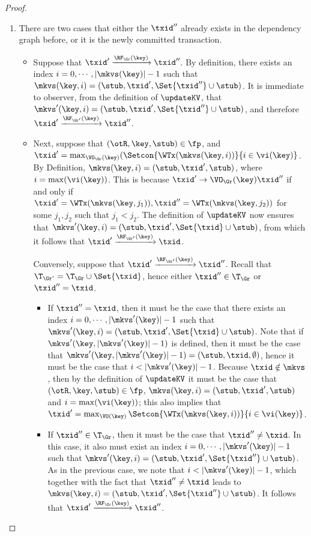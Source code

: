 \begin{proof}
\begin{enumerate}
\item There are two cases that either the \( \txid'' \) already exists in the dependency graph before,
or it is the newly committed transaction.
\begin{itemize}
\item Suppose that $\txid' \xrightarrow{\RF_{\Gr}(\key)} \txid''$. 
By definition, there exists an index $i = 0,\cdots, \lvert \mkvs(\key) \rvert - 1$ 
such that $\mkvs(\key, i) = (\stub, \txid', \Set{\txid''} \cup \stub)$. It is immediate 
to observer, from the definition of $\updateKV$, that $\mkvs'(\key, i) = (\stub, \txid', \Set{\txid''} \cup \stub)$, 
and therefore $\txid' \xrightarrow{\RF_{\Gr'}(\key)} \txid''$. 

\item Next, suppose that $(\otR, \key, \stub) \in \fp$, and $\txid' = \max_{\VO_{\Gr}(\key)}(\Setcon{\WTx(\mkvs(\key, i)) }{ i \in \vi(\key)}$. 
By Definition, $\mkvs(\key, i) = (\stub, \txid', \stub)$, where $i = \max(\vi(\key))$. This is because 
$\txid' \rightarrow{\VO_{\Gr}(\key)} \txid''$ if and only if $\txid' = \WTx(\mkvs(\key, j_1)), \txid'' = 
\WTx(\mkvs(\key, j_2))$ for some $j_1, j_2$ such that $j_1 < j_2$. 
The definition of $\updateKV$ now ensures that $\mkvs'(\key, i) = (\stub, \txid', \Set{\txid } \cup \stub)$, 
from which it follows that $\txid' \xrightarrow{\RF_{\Gr'}(\key)} \txid$.

Conversely, suppose that $\txid' \xrightarrow{\RF_{\Gr'}(\key)} \txid''$. 
Recall that $\T_{\Gr'} = \T_{\Gr} \cup \Set{ \txid }$, hence either 
$\txid'' \in \T_{\Gr}$ or $\txid'' = \txid$. 

\begin{itemize}
\item If $\txid'' = \txid$, then it must be the case that there exists an index $i = 0,\cdots, \lvert \mkvs'(\key) \rvert - 1$ 
such that $\mkvs'(\key, i) = (\stub, \txid', \Set{\txid } \cup \stub)$. Note that if $\mkvs'(\key, \lvert \mkvs'(\key) \rvert -1)$ is 
defined, then it must be the case that $\mkvs'(\key, \lvert \mkvs'(\key) \rvert -1) = (\stub, \txid, \emptyset)$, 
hence it must be the case that $i < \lvert \mkvs'(\key) \rvert - 1$. Because $\txid \notin \mkvs$, 
then by the definition of $\updateKV$ it must be the case that $(\otR, \key, \stub) \in \fp$, 
$\mkvs(\key, i) = (\stub, \txid', \stub)$ and $i = \max(\vi(\key))$; this also implies that $\txid' = 
\max_{\VO(\key)}\Setcon{\WTx(\mkvs(\key, i)) }{ i \in \vi(\key)}$. 

\item If $\txid'' \in \T_{\Gr}$, then  it must be the case that $\txid'' \neq \txid$. 
In this case, it also must exist an index $i = 0,\cdots, \lvert \mkvs'(\key) \rvert - 1$ 
such that $\mkvs'(\key, i) = (\stub, \txid', \Set{\txid''} \cup \stub)$. As in the previous 
case, we note that $i < \lvert \mkvs'(\key) \rvert - 1$, which together 
with the fact that $\txid'' \neq \txid$ leads to $\mkvs(\key, i) = (\stub, \txid', \Set{\txid''} \cup \stub)$. 
It follows that $\txid' \xrightarrow{\RF_{\Gr}(\key)} \txid''$.
\end{itemize}
\end{itemize}


\end{enumerate}
\end{proof}
